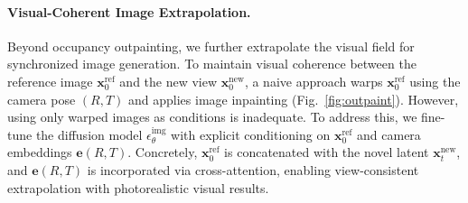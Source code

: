 \paragraph{Visual-Coherent Image Extrapolation.}
Beyond occupancy outpainting, we further extrapolate the visual field for synchronized image generation.
To maintain visual coherence between the reference image $\mathbf{x}_0^{\text{ref}}$ and the new view $\mathbf{x}_0^{\text{new}}$, a naive approach warps $\mathbf{x}_0^{\text{ref}}$ using the camera pose $(R, T)$ and applies image inpainting (Fig.~\ref{fig:outpaint}).
However, using only warped images as conditions is inadequate.
To address this, we fine-tune the diffusion model $\epsilon_{\theta}^{\text{img}}$ with explicit conditioning on $\mathbf{x}_0^{\text{ref}}$ and camera embeddings $\mathbf{e}(R, T)$.
Concretely, $\mathbf{x}_0^{\text{ref}}$ is concatenated with the novel latent $\mathbf{x}_t^{\text{new}}$, and $\mathbf{e}(R, T)$ is incorporated via cross-attention, enabling view-consistent extrapolation with photorealistic visual results.